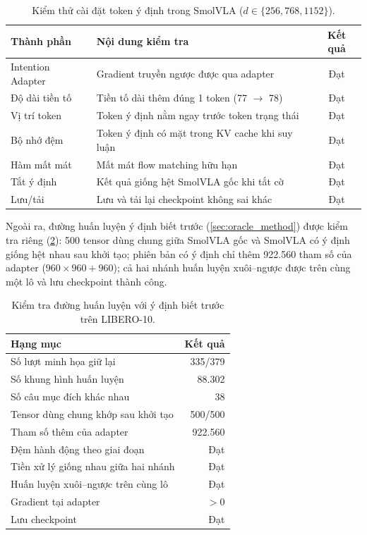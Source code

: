 \documentclass[a4paper,oneside]{report}
\begin{document}
\begin{table}[ht]
\centering
\caption{Kiểm thử cài đặt token ý định trong SmolVLA ($d\in\{256,768,1152\}$).}
\label{tab:integration}
\small
\begin{tabularx}{\linewidth}{l X c}
\toprule
Thành phần & Nội dung kiểm tra & Kết quả \\
\midrule
Intention Adapter & Gradient truyền ngược được qua adapter & Đạt \\
Độ dài tiền tố & Tiền tố dài thêm đúng 1 token (77 $\to$ 78) & Đạt \\
Vị trí token & Token ý định nằm ngay trước token trạng thái & Đạt \\
Bộ nhớ đệm & Token ý định có mặt trong KV cache khi suy luận & Đạt \\
Hàm mất mát & Mất mát flow matching hữu hạn & Đạt \\
Tắt ý định & Kết quả giống hệt SmolVLA gốc khi tắt cờ & Đạt \\
Lưu/tải & Lưu và tải lại checkpoint không sai khác & Đạt \\
\bottomrule
\end{tabularx}
\end{table}

Ngoài ra, đường huấn luyện ý định biết trước (\cref{sec:oracle_method}) được kiểm tra riêng (\cref{tab:oracle_checks}): 500 tensor dùng chung giữa SmolVLA gốc và SmolVLA có ý định giống hệt nhau sau khởi tạo; phiên bản có ý định chỉ thêm 922.560 tham số của adapter ($960\times960+960$); cả hai nhánh huấn luyện xuôi--ngược được trên cùng một lô và lưu checkpoint thành công.

\begin{table}[ht]
\centering
\caption{Kiểm tra đường huấn luyện với ý định biết trước trên LIBERO-10.}
\label{tab:oracle_checks}
\small
\begin{tabular}{lr}
\toprule
Hạng mục & Kết quả \\
\midrule
Số lượt minh họa giữ lại & 335/379 \\
Số khung hình huấn luyện & 88.302 \\
Số câu mục đích khác nhau & 38 \\
Tensor dùng chung khớp sau khởi tạo & 500/500 \\
Tham số thêm của adapter & 922.560 \\
Đệm hành động theo giai đoạn & Đạt \\
Tiền xử lý giống nhau giữa hai nhánh & Đạt \\
Huấn luyện xuôi--ngược trên cùng lô & Đạt \\
Gradient tại adapter & $>0$ \\
Lưu checkpoint & Đạt \\
\bottomrule
\end{tabular}
\end{table}
\end{document}
